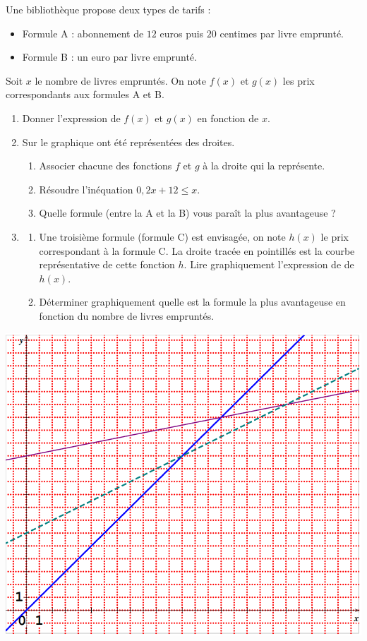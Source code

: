 \documentclass[11pt]{article}
\begin{document}
\newpage
\begin{exo}
Une bibliothèque propose deux types de tarifs :
\begin{itemize}
  \item Formule A : abonnement de $12$ euros puis $20$ centimes par livre
    emprunté.
  \item Formule B : un euro par livre emprunté.
\end{itemize}
Soit $x$ le nombre de livres empruntés. On note $f(x)$ et $g(x)$ les prix
correspondants aux formules A et B.
\begin{enumerate}
  \item Donner l'expression de $f(x)$ et $g(x)$ en fonction de $x$.
  \item Sur le graphique ont été représentées des droites.
    \begin{enumerate}
      \item Associer chacune des fonctions $f$ et $g$ à la droite qui la
        représente.
      \item Résoudre l'inéquation $0,2x+12\leq x$.
      \item Quelle formule (entre la A et la B) vous paraît la plus avantageuse
        ?
    \end{enumerate}
  \item \begin{enumerate}
      \item Une troisième formule (formule C) est envisagée, on note $h(x)$ le
        prix correspondant à la formule C. La droite tracée en pointillés est la
        courbe représentative de cette fonction $h$. Lire graphiquement
        l'expression de de $h(x)$.
      \item Déterminer graphiquement quelle est la formule la plus avantageuse
        en fonction du nombre de livres empruntés.
    \end{enumerate}
\end{enumerate}
\begin{center}
  \includegraphics[scale=.4]{pb1.png}
\end{center}
\end{exo}
\end{document}

